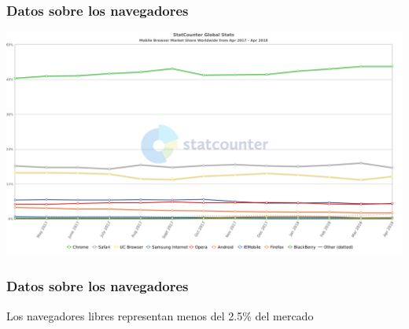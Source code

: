 \begin{frame}

    \frametitle{Datos sobre los navegadores}

    \includegraphics[width=\textwidth]{images/browsers-stats.png}
    
\end{frame}

\begin{frame}

    \frametitle{Datos sobre los navegadores}
    \centering
    \large{Los navegadores libres representan menos del 2.5\% del mercado}    
\end{frame}

